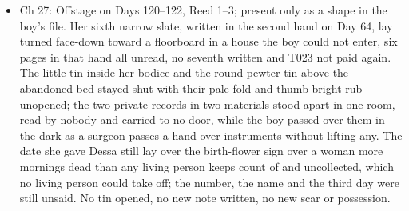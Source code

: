 \documentclass{design/chronicle}
\begin{document}
{\begin{itemize}[leftmargin=1.4em,itemsep=1pt,topsep=3pt,parsep=0pt]
\end{itemize}

\begin{itemize}[leftmargin=1.4em,itemsep=1pt,topsep=3pt,parsep=0pt]

\item Ch 27: Offstage on Days 120–122, Reed 1–3; present only as a shape in the boy’s file. Her sixth narrow slate, written in the second hand on Day 64, lay turned face-down toward a floorboard in a house the boy could not enter, six pages in that hand all unread, no seventh written and T023 not paid again. The little tin inside her bodice and the round pewter tin above the abandoned bed stayed shut with their pale fold and thumb-bright rub unopened; the two private records in two materials stood apart in one room, read by nobody and carried to no door, while the boy passed over them in the dark as a surgeon passes a hand over instruments without lifting any. The date she gave Dessa still lay over the birth-flower sign over a woman more mornings dead than any living person keeps count of and uncollected, which no living person could take off; the number, the name and the third day were still unsaid. No tin opened, no new note written, no new scar or possession.

\end{itemize}

\begin{itemize}[leftmargin=1.4em,itemsep=1pt,topsep=3pt,parsep=0pt]


\end{itemize}}
\end{document}
